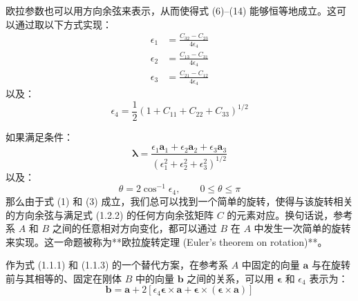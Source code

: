 欧拉参数也可以用方向余弦来表示，从而使得式 (6)--(14) 能够恒等地成立。这可以通过取以下方式实现：
\begin{align}
\epsilon_1 &= \frac{C_{32} - C_{23}}{4\epsilon_4} \tag{15} \\
\epsilon_2 &= \frac{C_{13} - C_{31}}{4\epsilon_4} \tag{16} \\
\epsilon_3 &= \frac{C_{21} - C_{12}}{4\epsilon_4} \tag{17}
\end{align}
以及：
\begin{equation}
\epsilon_4 = \frac{1}{2} (1 + C_{11} + C_{22} + C_{33})^{1/2} \tag{18}
\end{equation}

如果满足条件：
\begin{equation}
\boldsymbol{\lambda} = \frac{\epsilon_1 \mathbf{a}_1 + \epsilon_2 \mathbf{a}_2 + \epsilon_3 \mathbf{a}_3}{(\epsilon_1^2 + \epsilon_2^2 + \epsilon_3^2)^{1/2}} \tag{19}
\end{equation}
以及：
\begin{equation}
\theta = 2\cos^{-1}\epsilon_4, \qquad 0 \leq \theta \leq \pi \tag{20}
\end{equation}
那么由于式 (1) 和 (3) 成立，我们总可以找到一个简单的旋转，使得与该旋转相关的方向余弦与满足式 (1.2.2) 的任何方向余弦矩阵 \(C\) 的元素对应。换句话说，参考系 \(A\) 和 \(B\) 之间的任意相对方向变化，都可以通过 \(B\) 在 \(A\) 中发生一次简单的旋转来实现。这一命题被称为**欧拉旋转定理 (Euler's theorem on rotation)**。

作为式 (1.1.1) 和 (1.1.3) 的一个替代方案，在参考系 \(A\) 中固定的向量 \(\mathbf{a}\) 与在旋转前与其相等的、固定在刚体 \(B\) 中的向量 \(\mathbf{b}\) 之间的关系，可以用 \(\boldsymbol{\epsilon}\) 和 \(\epsilon_4\) 表示为：
\begin{equation}
\mathbf{b} = \mathbf{a} + 2[\epsilon_4 \boldsymbol{\epsilon} \times \mathbf{a} + \boldsymbol{\epsilon} \times (\boldsymbol{\epsilon} \times \mathbf{a})] \tag{21}
\end{equation}

